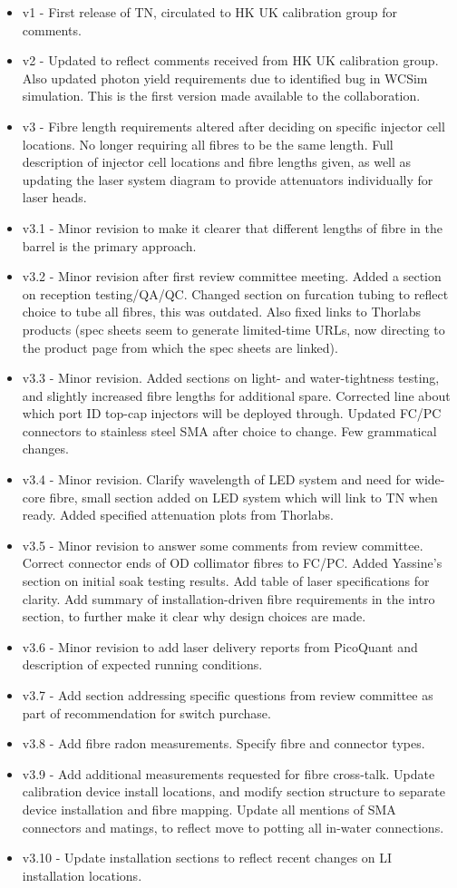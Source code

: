\documentclass[a4paper,11pt]{article}
\begin{document}
\begin{itemize}
\item v1 - First release of TN, circulated to HK UK calibration group for comments.
\item v2 - Updated to reflect comments received from HK UK calibration group. Also updated photon yield requirements due to identified bug in WCSim simulation. This is the first version made available to the collaboration.
\item v3 - Fibre length requirements altered after deciding on specific injector cell locations. No longer requiring all fibres to be the same length. Full description of injector cell locations and fibre lengths given, as well as updating the laser system diagram to provide attenuators individually for laser heads.
\item v3.1 - Minor revision to make it clearer that different lengths of fibre in the barrel is the primary approach.
\item v3.2 - Minor revision after first review committee meeting. Added a section on reception testing/QA/QC. Changed section on furcation tubing to reflect choice to tube all fibres, this was outdated. Also fixed links to Thorlabs products (spec sheets seem to generate limited-time URLs, now directing to the product page from which the spec sheets are linked). 
\item v3.3 - Minor revision. Added sections on light- and water-tightness testing, and slightly increased fibre lengths for additional spare. Corrected line about which port ID top-cap injectors will be deployed through. Updated FC/PC connectors to stainless steel SMA after choice to change. Few grammatical changes.
\item v3.4 - Minor revision. Clarify wavelength of LED system and need for wide-core fibre, small section added on LED system which will link to TN when ready. Added specified attenuation plots from Thorlabs.
\item v3.5 - Minor revision to answer some comments from review committee. Correct connector ends of OD collimator fibres to FC/PC. Added Yassine's section on initial soak testing results. Add table of laser specifications for clarity. Add summary of installation-driven fibre requirements in the intro section, to further make it clear why design choices are made.
\item v3.6 - Minor revision to add laser delivery reports from PicoQuant and description of expected running conditions.
\item v3.7 - Add section addressing specific questions from review committee as part of recommendation for switch purchase.
\item v3.8 - Add fibre radon measurements. Specify fibre and connector types.
\item v3.9 - Add additional measurements requested for fibre cross-talk. Update calibration device install locations, and modify section structure to separate device installation and fibre mapping. Update all mentions of SMA connectors and matings, to reflect move to potting all in-water connections.
\item v3.10 - Update installation sections to reflect recent changes on LI installation locations.
\end{itemize}
\end{document}
